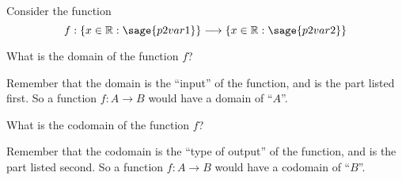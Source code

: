 \documentclass{ximera}
\begin{document}
\begin{problem}
    Consider the function 
    \[
        f:\{ x \in \mathbb{R} : \sage{p2var1} \} \longrightarrow \{ x \in \mathbb{R} : \sage{p2var2} \}
    \]
    
    What is the domain of the function $f$?
    \begin{multipleChoice}
    \end{multipleChoice}
    
    \begin{feedback}
        Remember that the domain is the ``input'' of the function, and is the part listed first. So a function $f:A\rightarrow B$ would have a domain of ``$A$''.
    \end{feedback}    
    
    What is the codomain of the function $f$?
    
    \begin{multipleChoice}
    \end{multipleChoice}
        
    \begin{feedback}
        Remember that the codomain is the ``type of output'' of the function, and is the part listed second. So a function $f:A\rightarrow B$ would have a codomain of ``$B$''.
    \end{feedback}    
\end{problem}
\end{document}
